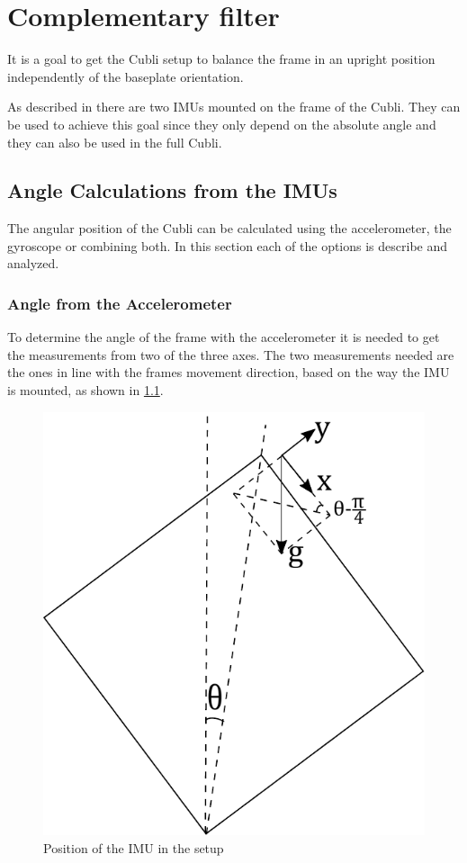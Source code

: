 \chapter{Complementary filter}\label{chap:CompFilter} 
It is a goal to get the Cubli setup to balance the frame in an upright position independently of the baseplate orientation.

As described in  there are two IMUs mounted on the frame of the Cubli. They can be used to achieve this goal since they only depend on the absolute angle and they can also be used in the full Cubli.

\section{Angle Calculations from the IMUs}
The angular position of the Cubli can be calculated using the accelerometer, the gyroscope or combining both. In this section each of the options is describe and analyzed.

\subsection{Angle from the Accelerometer}
To determine the angle of the frame with the accelerometer it is needed to get the measurements from two of the three axes. The two measurements needed are the ones in line with the frames movement direction, based on the way the IMU is mounted, as shown in \ref{accelerometer}.
\begin{figure}[H]
	\centering
	\includegraphics[scale=0.5]{figures/accelerometer}
	\caption{Position of the IMU in the setup}
	\label{accelerometer}
\end{figure}\vspace{-5mm}

